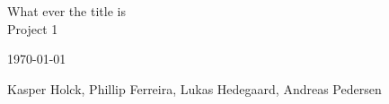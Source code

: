 \documentclass[../main.tex]{subfiles}
\begin{document}

\begin{titlepage}
    
    {\Large \noindent What ever the title is\\    
    Project 1}
    
    \vfill

    {\noindent \Large \today\par
    \noindent \Large Kasper Holck, Phillip Ferreira, Lukas Hedegaard, Andreas Pedersen}

\end{titlepage}
\end{document}
